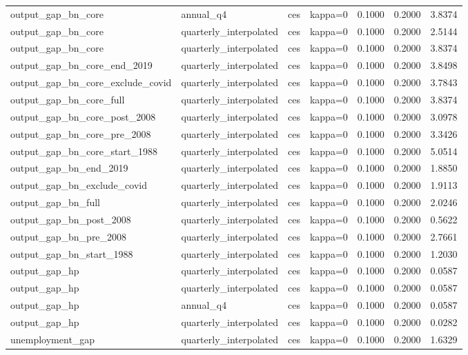 \begin{tabular}{llllrrr}
output\_gap\_bn\_core & annual\_q4 & ces & kappa=0 & 0.1000 & 0.2000 & 3.8374 \\
output\_gap\_bn\_core & quarterly\_interpolated & ces & kappa=0 & 0.1000 & 0.2000 & 2.5144 \\
output\_gap\_bn\_core & quarterly\_interpolated & ces & kappa=0 & 0.1000 & 0.2000 & 3.8374 \\
output\_gap\_bn\_core\_end\_2019 & quarterly\_interpolated & ces & kappa=0 & 0.1000 & 0.2000 & 3.8498 \\
output\_gap\_bn\_core\_exclude\_covid & quarterly\_interpolated & ces & kappa=0 & 0.1000 & 0.2000 & 3.7843 \\
output\_gap\_bn\_core\_full & quarterly\_interpolated & ces & kappa=0 & 0.1000 & 0.2000 & 3.8374 \\
output\_gap\_bn\_core\_post\_2008 & quarterly\_interpolated & ces & kappa=0 & 0.1000 & 0.2000 & 3.0978 \\
output\_gap\_bn\_core\_pre\_2008 & quarterly\_interpolated & ces & kappa=0 & 0.1000 & 0.2000 & 3.3426 \\
output\_gap\_bn\_core\_start\_1988 & quarterly\_interpolated & ces & kappa=0 & 0.1000 & 0.2000 & 5.0514 \\
output\_gap\_bn\_end\_2019 & quarterly\_interpolated & ces & kappa=0 & 0.1000 & 0.2000 & 1.8850 \\
output\_gap\_bn\_exclude\_covid & quarterly\_interpolated & ces & kappa=0 & 0.1000 & 0.2000 & 1.9113 \\
output\_gap\_bn\_full & quarterly\_interpolated & ces & kappa=0 & 0.1000 & 0.2000 & 2.0246 \\
output\_gap\_bn\_post\_2008 & quarterly\_interpolated & ces & kappa=0 & 0.1000 & 0.2000 & 0.5622 \\
output\_gap\_bn\_pre\_2008 & quarterly\_interpolated & ces & kappa=0 & 0.1000 & 0.2000 & 2.7661 \\
output\_gap\_bn\_start\_1988 & quarterly\_interpolated & ces & kappa=0 & 0.1000 & 0.2000 & 1.2030 \\
output\_gap\_hp & quarterly\_interpolated & ces & kappa=0 & 0.1000 & 0.2000 & 0.0587 \\
output\_gap\_hp & quarterly\_interpolated & ces & kappa=0 & 0.1000 & 0.2000 & 0.0587 \\
output\_gap\_hp & annual\_q4 & ces & kappa=0 & 0.1000 & 0.2000 & 0.0587 \\
output\_gap\_hp & quarterly\_interpolated & ces & kappa=0 & 0.1000 & 0.2000 & 0.0282 \\
unemployment\_gap & quarterly\_interpolated & ces & kappa=0 & 0.1000 & 0.2000 & 1.6329 \\

\end{tabular}
